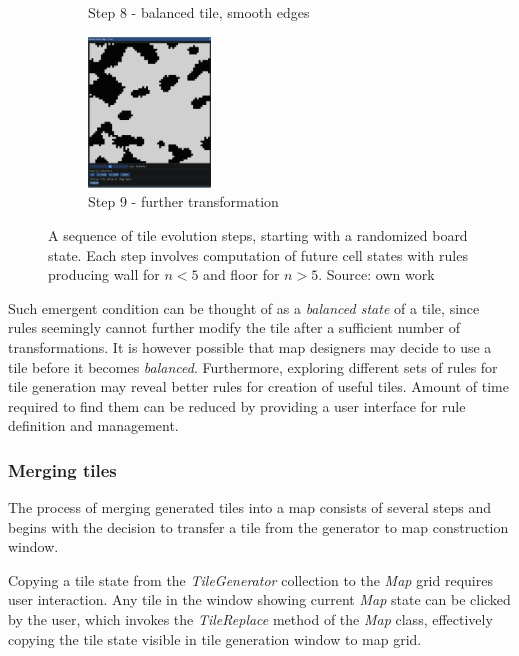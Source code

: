 \documentclass[12pt]{report}
\begin{document}
\begin{figure}[H]
\begin{subfigure}[t]{0.3\textwidth}
		\caption{Step 8 - balanced tile, smooth edges} 
	\end{subfigure} \hspace{1em} 
	\begin{subfigure}[t]{0.3\textwidth}
		\centering
		\includegraphics[height=4cm]{images/s_9}
		\caption{Step 9 - further transformation} 
	\end{subfigure} \hspace{1em} 
	\label{fig:gensteps}
	\caption{A sequence of tile evolution steps, starting with a randomized board state. Each step involves computation of future cell states with rules producing wall for $n < 5$ and floor for $n > 5$. Source: own work} 
\end{figure}

Such emergent condition can be thought of as a \textit{balanced state} of a tile, since rules seemingly cannot further modify the tile after a sufficient number of transformations. It is however possible that map designers may decide to use a tile before it becomes \textit{balanced}. Furthermore, exploring different sets of rules for tile generation may reveal better rules for creation of useful tiles. Amount of time required to find them can be reduced by providing a user interface for rule definition and management.

\subsubsection{Merging tiles}
 
The process of merging generated tiles into a map consists of several steps and begins with the decision to transfer a tile from the generator to map construction window.

Copying a tile state from the \textit{TileGenerator} collection to the \textit{Map} grid requires user interaction. Any tile in the window showing current \textit{Map} state can be clicked by the user, which invokes the \textit{TileReplace} method of the \textit{Map} class, effectively copying the tile state visible in tile generation window to map grid. 
\end{document}

